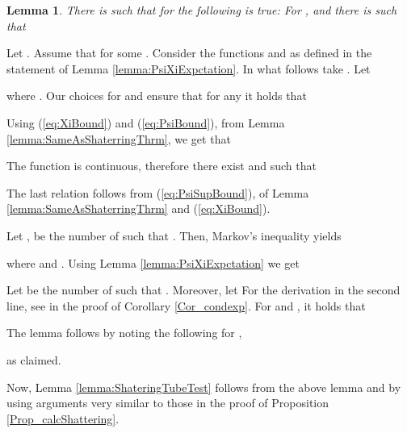 \documentclass[a4paper,10pt]{article}
\makeatletter
\newtheorem{lemma}{Lemma}\renewcommand{\thelemma}{\arabic{lemma}}
\newenvironment{proof}{\noindent{\bf Proof\@:}}{\hfill \\}
\makeatother
\begin{document}
\begin{lemma}
There  is  such that for  the following is true: For ,
and  
there is  such that

\end{lemma}
\begin{proof}
Let . Assume that  for some
. Consider the functions  
and  as defined in the statement of Lemma
\ref{lemma:PsiXiExpctation}. 
In what follows take . Let 

where .
Our choices for  and  ensure that for any
 it holds that


\noindent
Using (\ref{eq:XiBound}) and (\ref{eq:PsiBound}), from Lemma \ref{lemma:SameAsShaterringThrm},
we get that 

The function  is continuous, therefore there exist  
and  such that

The last relation follows from (\ref{eq:PsiSupBound}), of Lemma \ref{lemma:SameAsShaterringThrm}
and (\ref{eq:XiBound}).

Let , be the number of  such that
. Then,  Markov's
inequality yields

where  and . Using Lemma
\ref{lemma:PsiXiExpctation} we get 


\noindent
Let  be the number of  such that . Moreover, let 
For the derivation in the second line, see in the proof of Corollary
\ref{Cor_condexp}.
For  and , it holds that



\noindent
The lemma follows by noting the following for , 

as claimed.
\end{proof}

\noindent
Now,  Lemma \ref{lemma:ShateringTubeTest} follows from the above lemma and
by using arguments very similar to those in the proof of Proposition \ref{Prop_calcShattering}.
\end{document}
